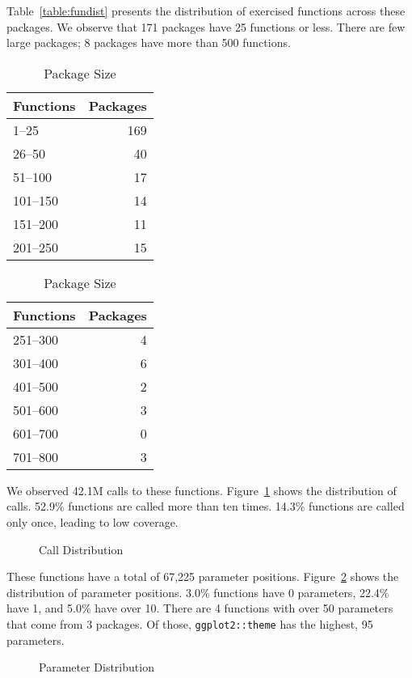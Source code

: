 \documentclass[10pt,review,sigplan,anonymous=true,authorversion=true,nonacm=true]{acmart}
\begin{document}
Table~\ref{table:fundist} presents the distribution of exercised functions
across these packages. We observe that 171 packages have 25 functions or less.
There are few large packages; 8 packages have more than 500 functions.

\begin{table}[!h]
  \vspace{-2mm}
  \small
  \caption{Package Size} \label{table:packsize}
  \centering
  \begin{tabular}{lr}
    \toprule
    \bf Functions&\bf Packages\\
    \midrule
    1--25&169\\
    26--50&40\\
    51--100&17\\
    101--150&14\\
    151--200&11\\
    201--250&15\\
    \bottomrule
  \end{tabular}
  \quad
  \begin{tabular}{lr}
    \toprule
    \bf Functions&\bf Packages\\
    \midrule
    251--300&4\\
    301--400&6\\
    401--500&2\\
    501--600&3\\
    601--700&0\\
    701--800&3\\
    \bottomrule
  \end{tabular}
\end{table}

We observed 42.1M calls to these functions. Figure~\ref{fig:calldist} shows the
distribution of calls. 52.9\% functions are called more than ten times. 14.3\%
functions are called only once, leading to low coverage.

\begin{figure}[!h]
  \centering
  
  \caption{Call Distribution}
  \label{fig:calldist}
\end{figure}

These functions have a total of 67,225 parameter positions.
Figure~\ref{fig:paramdist} shows the distribution of parameter positions. 3.0\%
functions have 0 parameters, 22.4\% have 1, and 5.0\% have over 10. There are 4
functions with over 50 parameters that come from 3 packages. Of those,
\texttt{ggplot2::theme} has the highest, 95 parameters.

\begin{figure}[!h]
  \centering
  
  \caption{Parameter Distribution}
  \label{fig:paramdist}
\end{figure}
\end{document}
